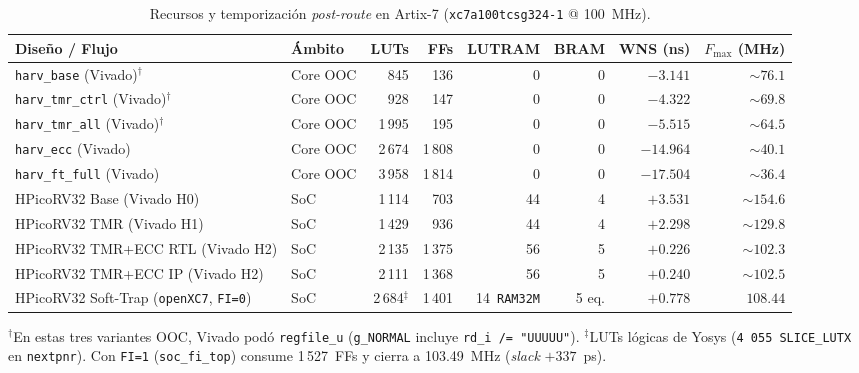 \documentclass[a4paper,10pt]{article}
\begin{document}
\begin{table}[htbp]
  \centering
  \footnotesize
  \setlength{\tabcolsep}{4pt}
  \caption{Recursos y temporización \textit{post-route} en Artix-7 (\texttt{xc7a100tcsg324-1} @ 100~MHz).}
  \label{tab:res}
  \begin{tabularx}{\textwidth}{@{}Ylrrrrrr@{}}
    \toprule
    \textbf{Diseño / Flujo} & \textbf{Ámbito} & \textbf{LUTs} & \textbf{FFs} & \textbf{LUTRAM} & \textbf{BRAM} & \textbf{WNS (ns)} & \textbf{$F_{\max}$ (MHz)} \\
    \midrule
    \texttt{harv\_base} (Vivado)$^\dagger$ & Core OOC & 845 & 136 & 0 & 0 & $-3.141$ & $\sim 76.1$ \\
    \texttt{harv\_tmr\_ctrl} (Vivado)$^\dagger$ & Core OOC & 928 & 147 & 0 & 0 & $-4.322$ & $\sim 69.8$ \\
    \texttt{harv\_tmr\_all} (Vivado)$^\dagger$ & Core OOC & 1\,995 & 195 & 0 & 0 & $-5.515$ & $\sim 64.5$ \\
    \texttt{harv\_ecc} (Vivado) & Core OOC & 2\,674 & 1\,808 & 0 & 0 & $-14.964$ & $\sim 40.1$ \\
    \texttt{harv\_ft\_full} (Vivado) & Core OOC & 3\,958 & 1\,814 & 0 & 0 & $-17.504$ & $\sim 36.4$ \\
    \midrule
    HPicoRV32 Base (Vivado H0) & SoC & 1\,114 & 703 & 44 & 4 & $+3.531$ & $\sim 154.6$ \\
    HPicoRV32 TMR (Vivado H1) & SoC & 1\,429 & 936 & 44 & 4 & $+2.298$ & $\sim 129.8$ \\
    HPicoRV32 TMR+ECC RTL (Vivado H2) & SoC & 2\,135 & 1\,375 & 56 & 5 & $+0.226$ & $\sim 102.3$ \\
    HPicoRV32 TMR+ECC IP (Vivado H2) & SoC & 2\,111 & 1\,368 & 56 & 5 & $+0.240$ & $\sim 102.5$ \\
    \midrule
    HPicoRV32 Soft-Trap (\texttt{openXC7}, \texttt{FI=0}) & SoC & 2\,684$^\ddagger$ & 1\,401 & 14~\texttt{RAM32M} & 5 eq. & $+0.778$ & $108.44$ \\
    \bottomrule
  \end{tabularx}
  \vspace{3pt}
  \begin{minipage}{\textwidth}
    \raggedright\scriptsize
    $^\dagger$En estas tres variantes OOC, Vivado podó \texttt{regfile\_u} (\texttt{g\_NORMAL} incluye \texttt{rd\_i /= "UUUUU"}).
    $^\ddagger$LUTs lógicas de Yosys (\texttt{4\,055 SLICE\_LUTX} en \texttt{nextpnr}). Con \texttt{FI=1} (\texttt{soc\_fi\_top}) consume 1\,527~FFs y cierra a 103.49~MHz (\textit{slack} $+337$~ps).
  \end{minipage}
\end{table}
\end{document}
